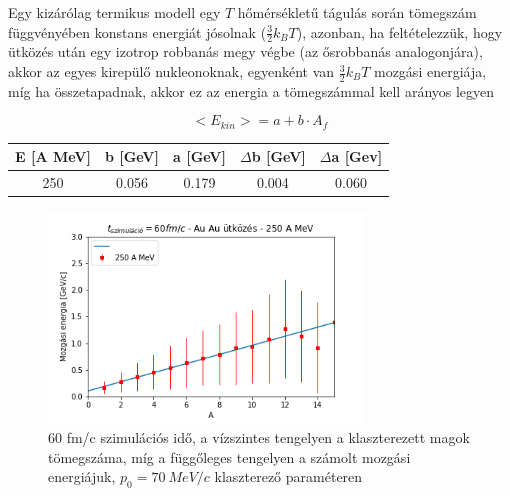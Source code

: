 \documentclass[a4paper,12pt]{article}
\begin{document}
\vspace{5mm}

\par Egy kizárólag termikus modell egy $T$ hőmérsékletű tágulás során tömegszám függvényében konstans energiát jósolnak ($\frac{3}{2}k_{B}T$), azonban, ha feltételezzük, hogy ütközés után egy izotrop robbanás megy végbe (az ősrobbanás analogonjára), akkor az egyes kirepülő nukleonoknak, egyenként van $\frac{3}{2}k_{B}T$ mozgási energiája, míg ha összetapadnak, akkor ez az energia a tömegszámmal kell arányos legyen

\vspace{5mm}

\begin{equation}
\big<E_{kin}\big> = a + b\cdot A_{f}
\label{blast-model}
\end{equation}

\vspace{5mm}

\begin{center}
\begin{tabular}{|c|c|c|c|c|}
\hline
E [A MeV] & b [GeV] & a [GeV] & $\Delta$b [GeV] & $\Delta$a [Gev] \\
\hline
250 & 0.056 & 0.179 & 0.004 & 0.060 \\
\hline
\end{tabular}
\end{center}

\vspace{5mm}

\begin{figure}[H]
\centering
\includegraphics[width=0.75\textwidth]{./60fmcAuAu250AMeV007mom.png}
\caption{60 fm/c szimulációs idő, a vízszintes tengelyen a klaszterezett magok tömegszáma, míg a függőleges tengelyen a számolt mozgási energiájuk, $p_{0} = 70 ~MeV/c$ klaszterező paraméteren}
\end{figure}
\end{document}
